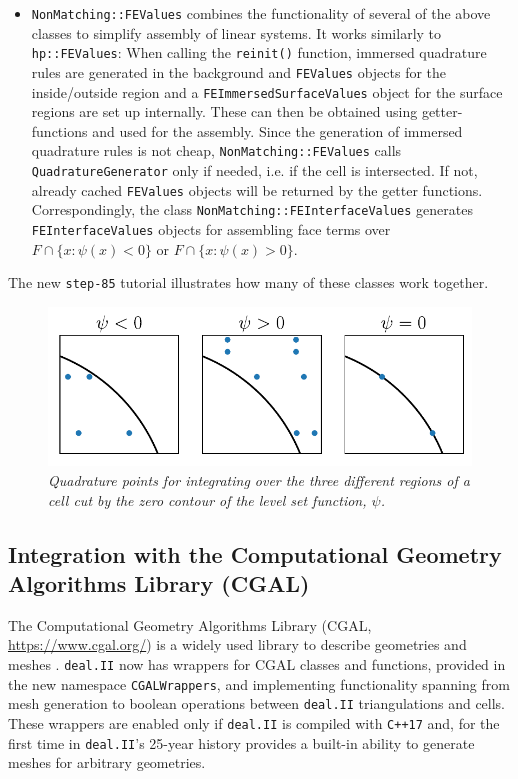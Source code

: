 \documentclass{ansarticle-preprint}
\newcommand{\specialword}[1]{\texttt{#1}}
\newcommand{\dealii}{{\specialword{deal.II}}\xspace}
\begin{document}
\begin{itemize}
  \item \texttt{NonMatching::FEValues} combines the functionality of
    several of the above classes to simplify assembly of linear systems. It works similarly to \texttt{hp::FEValues}:
  When calling the \texttt{reinit()} function, immersed quadrature rules are generated in the background and
  \texttt{FEValues} objects for the inside/outside region and a \texttt{FEImmersedSurfaceValues} object for the surface regions are set up internally. These can then be obtained using getter-functions and used for the assembly.
  Since the generation of immersed quadrature rules is not cheap,
  \texttt{NonMatching::FEValues} calls  \texttt{QuadratureGenerator} only if needed, i.e. if the cell is intersected. If not, already cached \texttt{FEValues} objects will be returned by the getter functions.
  Correspondingly, the class \texttt{NonMatching::FEInterfaceValues} generates
  \texttt{FEInterfaceValues} objects for assembling face terms over $F \cap \{x : \psi(x) < 0 \}$ or $F \cap \{x : \psi(x) > 0 \}$.
\end{itemize}
The new \texttt{step-85} tutorial illustrates how many of these classes work together.

\begin{figure}
  \centering
  \includegraphics[width=.4\paperwidth]{svg/immersed_quadratures.pdf}
  \caption{\it Quadrature points for integrating over the three different regions of a cell cut by the zero contour of the level set function, $\psi$. \label{fig:immersed_quadratures}}
\end{figure}




\subsection{Integration with the Computational Geometry Algorithms
  Library (CGAL)}\label{sec:cgalwrappers}

The Computational Geometry Algorithms Library (CGAL, \url{https://www.cgal.org/}) is a widely used
library to describe geometries and meshes \cite{cgal}. \dealii{} now
has wrappers for CGAL classes and functions, provided in the new
namespace \texttt{CGALWrappers}, and implementing functionality
spanning from mesh generation to boolean operations between \dealii{}
triangulations and cells. These wrappers are enabled only if \dealii{}
is compiled with \texttt{C++17} and, for the first time in \dealii{}'s
25-year history provides a built-in ability to generate meshes for
arbitrary geometries.
\end{document}
